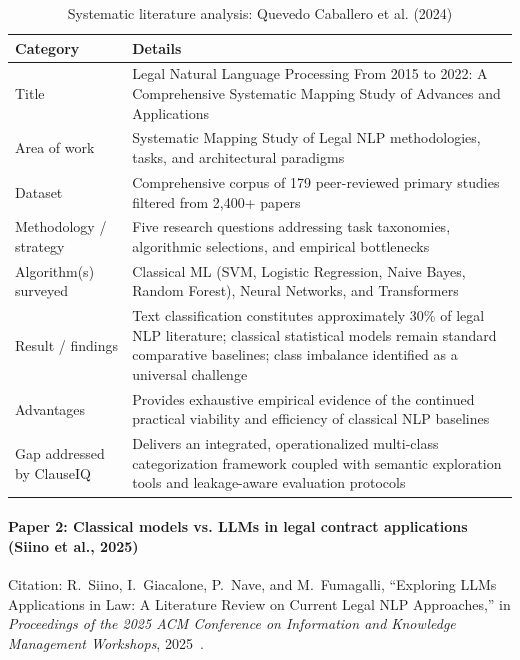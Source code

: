 \begin{table}[htbp]
\centering
\small
\begin{tabular}{>{\raggedright\arraybackslash}p{3.8cm} >{\raggedright\arraybackslash}p{11.0cm}}
\toprule
\textbf{Category} & \textbf{Details} \\
\midrule
Title & Legal Natural Language Processing From 2015 to 2022: A Comprehensive Systematic Mapping Study of Advances and Applications \\
Area of work & Systematic Mapping Study of Legal NLP methodologies, tasks, and architectural paradigms \\
Dataset & Comprehensive corpus of 179 peer-reviewed primary studies filtered from 2,400+ papers \\
Methodology / strategy & Five research questions addressing task taxonomies, algorithmic selections, and empirical bottlenecks \\
Algorithm(s) surveyed & Classical ML (SVM, Logistic Regression, Naive Bayes, Random Forest), Neural Networks, and Transformers \\
Result / findings & Text classification constitutes approximately 30\% of legal NLP literature; classical statistical models remain standard comparative baselines; class imbalance identified as a universal challenge \\
Advantages & Provides exhaustive empirical evidence of the continued practical viability and efficiency of classical NLP baselines \\
Gap addressed by ClauseIQ & Delivers an integrated, operationalized multi-class categorization framework coupled with semantic exploration tools and leakage-aware evaluation protocols \\
\bottomrule
\end{tabular}
\caption{Systematic literature analysis: Quevedo Caballero et al. (2024)}\label{tab:lit_quevedo}
\end{table}

\newpage
\paragraph*{Paper 2: Classical models vs. LLMs in legal contract applications (Siino et al., 2025)}

\noindent Citation: R.~Siino, I.~Giacalone, P.~Nave, and M.~Fumagalli, ``Exploring LLMs Applications in Law: A Literature Review on Current Legal NLP Approaches,'' in \textit{Proceedings of the 2025 ACM Conference on Information and Knowledge Management Workshops}, 2025~\cite{siino2025exploring}.

